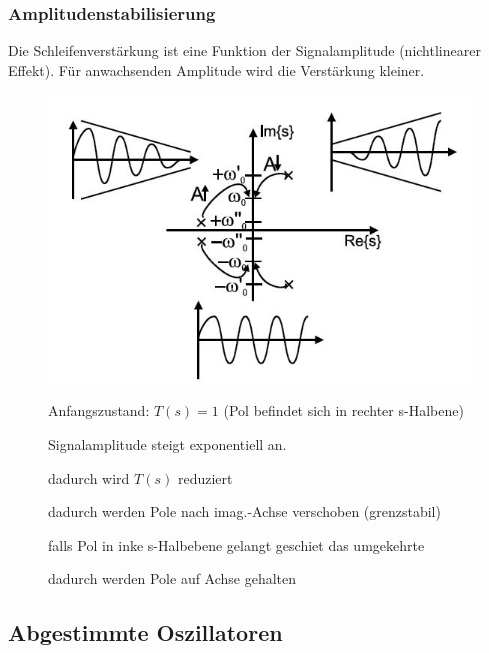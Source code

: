 \FloatBarrier
\subsubsection{Amplitudenstabilisierung}
Die Schleifenverstärkung ist eine Funktion der Signalamplitude (nichtlinearer Effekt). Für anwachsenden Amplitude wird die Verstärkung kleiner. 
\begin{figure}[h!]
	\begin{minipage}{0.4\textwidth} 
	  \includegraphics[width=1\textwidth]{images/Pollage_Regelung}
	\end{minipage}
	\begin{minipage}{0.5\textwidth}
      \begin{compactenum}
        \item Anfangszustand: $T(s)=1$ (Pol befindet sich in rechter s-Halbene)
        \item Signalamplitude steigt exponentiell an.
        \item dadurch wird $T(s)$ reduziert
        \item dadurch werden Pole nach imag.-Achse verschoben (grenzstabil)
        \item falls Pol in inke s-Halbebene gelangt geschiet das umgekehrte
        \item dadurch werden Pole auf Achse gehalten
      \end{compactenum}
	\end{minipage}
\end{figure}

\FloatBarrier
\subsection{Abgestimmte Oszillatoren}
